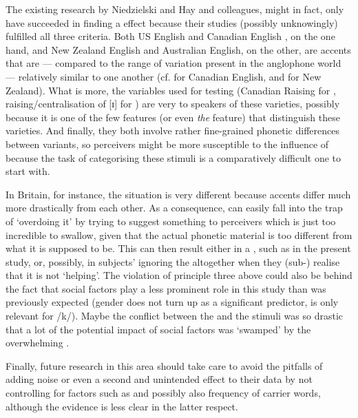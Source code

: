 The existing research by Niedzielski and Hay and colleagues, might in fact, only have succeeded in finding a  effect because their studies (possibly unknowingly) fulfilled all three criteria.
Both US English and Canadian English , on the one hand, and New Zealand English and Australian English, on the other, are accents that are --- compared to the range of variation present in the anglophone world --- relatively similar to one another (cf. \citealt[31]{halford2002} for Canadian English, and \citealt[354]{hayetal2006a}for New Zealand).
What is more, the variables used for testing (Canadian Raising for \citealt{niedzielski1999}, raising/centralisation of [ɪ] for \citealt{hayetal2006a,haydrager2010}) are very  to speakers of these varieties, possibly because it is one of the few features (or even \emph{the} feature) that distinguish these varieties.
And finally, they both involve rather fine-grained phonetic differences between variants, so perceivers might be more susceptible to the influence of  because the task of categorising these stimuli is a comparatively difficult one to start with.

In Britain, for instance, the situation is very different because accents differ much more drastically from each other.
As a consequence,  can easily fall into the trap of `overdoing it' by trying to suggest something to perceivers which is just too incredible to swallow, given that the actual phonetic material is too different from what it is supposed to be.
This can then result either in a , such as in the present study, or, possibly, in subjects' ignoring the  altogether \parencite[like in][]{lawrence2015} when they (sub-) realise that it is not `helping'.
The violation of principle three above could also be behind the fact that social factors play a less prominent role in this study than was previously expected (gender does not turn up as a significant predictor,  is only relevant for /k/).
Maybe the conflict between the  and the stimuli was so drastic that a lot of the potential impact of social factors was `swamped' by the overwhelming .

Finally, future research in this area should take care to avoid the pitfalls of adding noise or even a second and unintended  effect to their data by not controlling for factors such as  and possibly also frequency of carrier words, although the evidence is less clear in the latter respect.

